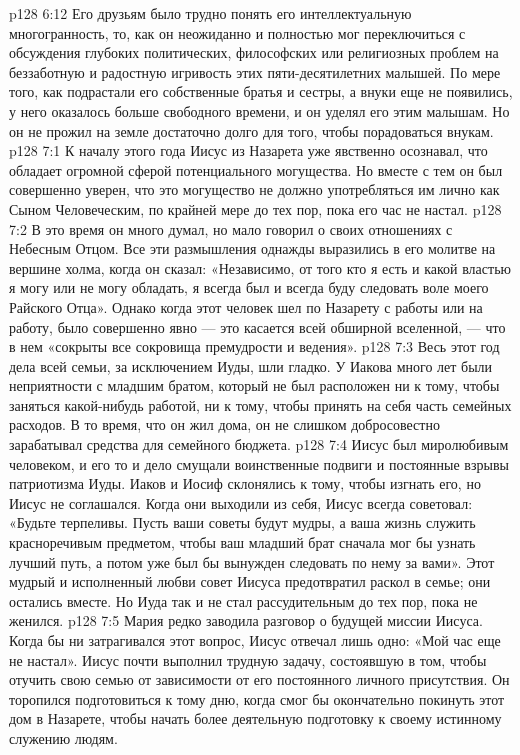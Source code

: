 \vs p128 6:12 Его друзьям было трудно понять его интеллектуальную многогранность, то, как он неожиданно и полностью мог переключиться с обсуждения глубоких политических, философских или религиозных проблем на беззаботную и радостную игривость этих пяти\hyp{}десятилетних малышей. По мере того, как подрастали его собственные братья и сестры, а внуки еще не появились, у него оказалось больше свободного времени, и он уделял его этим малышам. Но он не прожил на земле достаточно долго для того, чтобы порадоваться внукам.
\vs p128 7:1 К началу этого года Иисус из Назарета уже явственно осознавал, что обладает огромной сферой потенциального могущества. Но вместе с тем он был совершенно уверен, что это могущество не должно употребляться им лично как Сыном Человеческим, по крайней мере до тех пор, пока его час не настал.
\vs p128 7:2 В это время он много думал, но мало говорил о своих отношениях с Небесным Отцом. Все эти размышления однажды выразились в его молитве на вершине холма, когда он сказал: «Независимо, от того кто я есть и какой властью я могу или не могу обладать, я всегда был и всегда буду следовать воле моего Райского Отца». Однако когда этот человек шел по Назарету с работы или на работу, было совершенно явно --- это касается всей обширной вселенной, --- что в нем «сокрыты все сокровища премудрости и ведения».
\vs p128 7:3 \pc Весь этот год дела всей семьи, за исключением Иуды, шли гладко. У Иакова много лет были неприятности с младшим братом, который не был расположен ни к тому, чтобы заняться какой\hyp{}нибудь работой, ни к тому, чтобы принять на себя часть семейных расходов. В то время, что он жил дома, он не слишком добросовестно зарабатывал средства для семейного бюджета.
\vs p128 7:4 Иисус был миролюбивым человеком, и его то и дело смущали воинственные подвиги и постоянные взрывы патриотизма Иуды. Иаков и Иосиф склонялись к тому, чтобы изгнать его, но Иисус не соглашался. Когда они выходили из себя, Иисус всегда советовал: «Будьте терпеливы. Пусть ваши советы будут мудры, а ваша жизнь служить красноречивым предметом, чтобы ваш младший брат сначала мог бы узнать лучший путь, а потом уже был бы вынужден следовать по нему за вами». Этот мудрый и исполненный любви совет Иисуса предотвратил раскол в семье; они остались вместе. Но Иуда так и не стал рассудительным до тех пор, пока не женился.
\vs p128 7:5 Мария редко заводила разговор о будущей миссии Иисуса. Когда бы ни затрагивался этот вопрос, Иисус отвечал лишь одно: «Мой час еще не настал». Иисус почти выполнил трудную задачу, состоявшую в том, чтобы отучить свою семью от зависимости от его постоянного личного присутствия. Он торопился подготовиться к тому дню, когда смог бы окончательно покинуть этот дом в Назарете, чтобы начать более деятельную подготовку к своему истинному служению людям.

